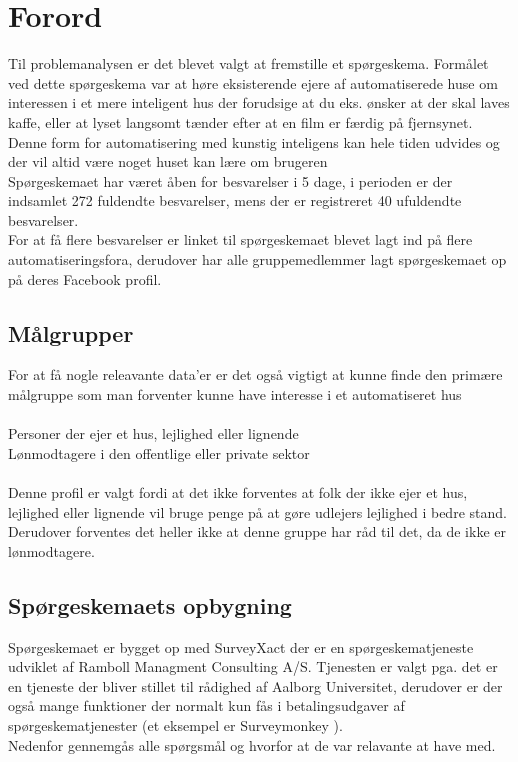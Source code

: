 \section{Forord}
Til problemanalysen er det blevet valgt at fremstille et spørgeskema. Formålet ved dette spørgeskema var at høre eksisterende ejere af automatiserede huse om interessen i et mere inteligent hus der forudsige at du eks. ønsker at der skal laves kaffe, eller at lyset langsomt tænder efter at en film er færdig på fjernsynet.\\
Denne form for automatisering med kunstig inteligens kan hele tiden udvides og der vil altid være noget huset kan lære om brugeren\\
Spørgeskemaet har været åben for besvarelser i 5 dage, i perioden er der indsamlet 272 fuldendte besvarelser, mens der er registreret 40 ufuldendte besvarelser.\\For at få flere besvarelser er linket til spørgeskemaet blevet lagt ind på flere automatiseringsfora, derudover har alle gruppemedlemmer lagt spørgeskemaet op på deres Facebook profil.\\

\subsection{Målgrupper}
For at få nogle releavante data'er er det også vigtigt at kunne finde den primære målgruppe som man forventer kunne have interesse i et automatiseret hus\\\\
\indent Personer der ejer et hus, lejlighed eller lignende\\
\indent Lønmodtagere i den offentlige eller private sektor\\\\
Denne profil er valgt fordi at det ikke forventes at folk der ikke ejer et hus, lejlighed eller lignende vil bruge penge på at gøre udlejers lejlighed i bedre stand. Derudover forventes det heller ikke at denne gruppe har råd til det, da de ikke er lønmodtagere.

\subsection{Spørgeskemaets opbygning}
Spørgeskemaet er bygget op med SurveyXact der er en spørgeskematjeneste udviklet af Ramboll Managment Consulting A/S. Tjenesten er valgt pga. det er en tjeneste der bliver stillet til rådighed af Aalborg Universitet, derudover er der også mange funktioner der normalt kun fås i betalingsudgaver af spørgeskematjenester (et eksempel er Surveymonkey \cite{surveymonkeyprice}).\\Nedenfor gennemgås alle spørgsmål og hvorfor at de var relavante at have med.
\\\\